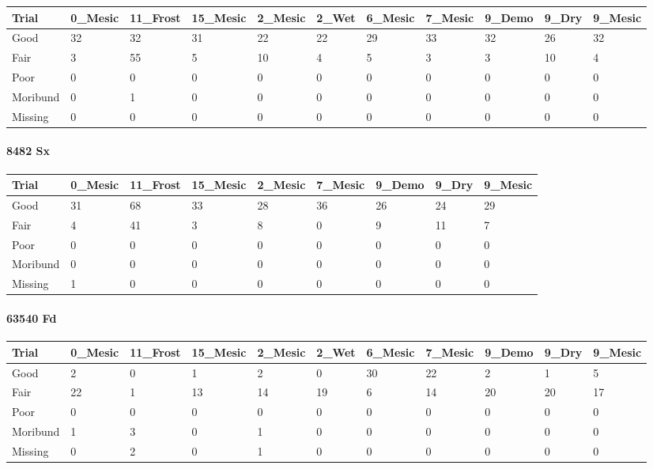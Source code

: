 \documentclass[
]{article}
\begin{document}
\begin{tabular}{l|l|l|l|l|l|l|l|l|l|l}
\hline
Trial & 0\_Mesic & 11\_Frost & 15\_Mesic & 2\_Mesic & 2\_Wet & 6\_Mesic & 7\_Mesic & 9\_Demo & 9\_Dry & 9\_Mesic\\
\hline
Good & 32 & 32 & 31 & 22 & 22 & 29 & 33 & 32 & 26 & 32\\
\hline
Fair & 3 & 55 & 5 & 10 & 4 & 5 & 3 & 3 & 10 & 4\\
\hline
Poor & 0 & 0 & 0 & 0 & 0 & 0 & 0 & 0 & 0 & 0\\
\hline
Moribund & 0 & 1 & 0 & 0 & 0 & 0 & 0 & 0 & 0 & 0\\
\hline
Missing & 0 & 0 & 0 & 0 & 0 & 0 & 0 & 0 & 0 & 0\\
\hline
\end{tabular}

\hypertarget{sx-1}{%
\paragraph{8482 Sx}\label{sx-1}}

\begin{tabular}{l|l|l|l|l|l|l|l|l}
\hline
Trial & 0\_Mesic & 11\_Frost & 15\_Mesic & 2\_Mesic & 7\_Mesic & 9\_Demo & 9\_Dry & 9\_Mesic\\
\hline
Good & 31 & 68 & 33 & 28 & 36 & 26 & 24 & 29\\
\hline
Fair & 4 & 41 & 3 & 8 & 0 & 9 & 11 & 7\\
\hline
Poor & 0 & 0 & 0 & 0 & 0 & 0 & 0 & 0\\
\hline
Moribund & 0 & 0 & 0 & 0 & 0 & 0 & 0 & 0\\
\hline
Missing & 1 & 0 & 0 & 0 & 0 & 0 & 0 & 0\\
\hline
\end{tabular}

\hypertarget{fd-1}{%
\paragraph{63540 Fd}\label{fd-1}}

\begin{tabular}{l|l|l|l|l|l|l|l|l|l|l}
\hline
Trial & 0\_Mesic & 11\_Frost & 15\_Mesic & 2\_Mesic & 2\_Wet & 6\_Mesic & 7\_Mesic & 9\_Demo & 9\_Dry & 9\_Mesic\\
\hline
Good & 2 & 0 & 1 & 2 & 0 & 30 & 22 & 2 & 1 & 5\\
\hline
Fair & 22 & 1 & 13 & 14 & 19 & 6 & 14 & 20 & 20 & 17\\
\hline
Poor & 0 & 0 & 0 & 0 & 0 & 0 & 0 & 0 & 0 & 0\\
\hline
Moribund & 1 & 3 & 0 & 1 & 0 & 0 & 0 & 0 & 0 & 0\\
\hline
Missing & 0 & 2 & 0 & 1 & 0 & 0 & 0 & 0 & 0 & 0\\
\hline
\end{tabular}
\end{document}
